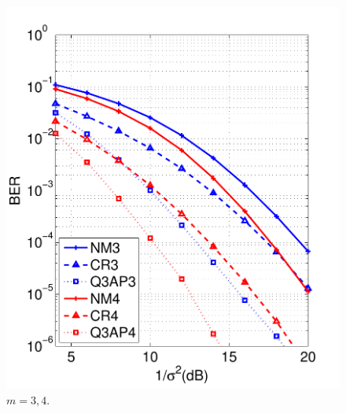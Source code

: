 \documentclass{beamer}
\begin{document}
\begin{frame}
\begin{columns}
    \begin{figure}
      \includegraphics[width=1.0\textwidth]{figs/BER_noise_power_MonteCarlo_64QAM_45_Q3AP.pdf}
      \caption{$m=3,4$.}
    \end{figure}
  \end{columns}
\end{frame}
\end{document}

